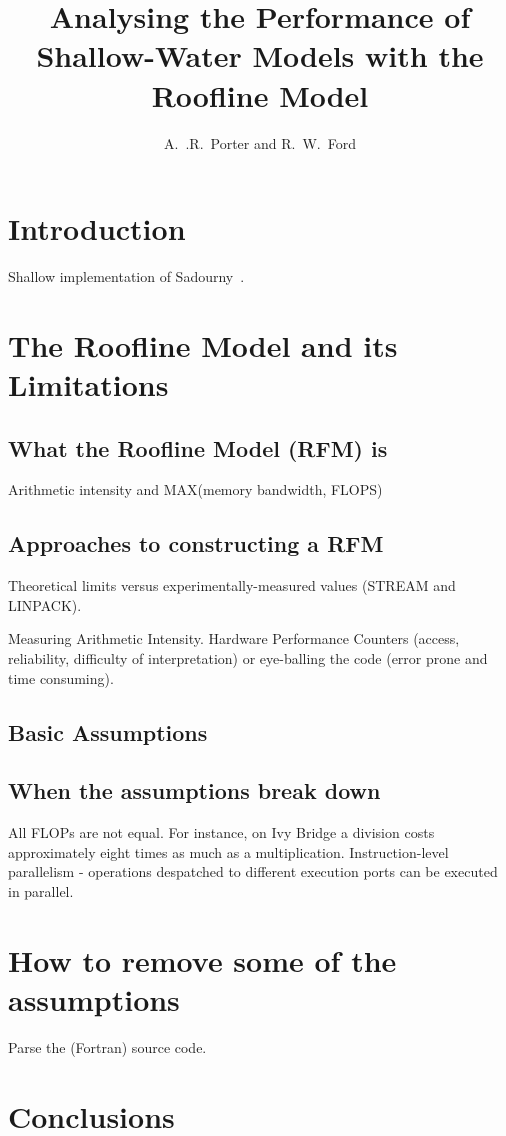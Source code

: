 \documentclass[12pt]{article}
\begin{document}
\title{Analysing the Performance of Shallow-Water Models with the
 Roofline Model}

\author{A.~.R.~Porter and R.~W.~Ford}

\maketitle

\section{Introduction}

Shallow implementation of Sadourny~\cite{sadourny75}.

\section{The Roofline Model and its Limitations}

\subsection{What the Roofline Model (RFM) is}

Arithmetic intensity and MAX(memory bandwidth, FLOPS)

\subsection{Approaches to constructing a RFM}

Theoretical limits versus experimentally-measured values (STREAM and
LINPACK).

Measuring Arithmetic Intensity. Hardware Performance Counters (access,
reliability, difficulty of interpretation) or eye-balling the code
(error prone and time consuming).

\subsection{Basic Assumptions}
\subsection{When the assumptions break down}

All FLOPs are not equal. For instance, on Ivy Bridge a division costs
approximately eight times as much as a multiplication.
Instruction-level parallelism - operations despatched to different
execution ports can be executed in parallel.

\section{How to remove some of the assumptions}

Parse the (Fortran) source code.

\section{Conclusions}



\end{document}
